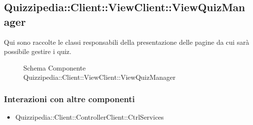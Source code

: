 \subsection{Quizzipedia::Client::ViewClient::ViewQuizManager}
Qui sono raccolte le classi responsabili della presentazione delle pagine da cui sarà possibile gestire i quiz.
\begin{figure}[H]
\centering
\noindent{}
\caption[Schema Componente Quizzipedia::Client::ViewClient::ViewQuizManager]{Schema Componente Quizzipedia::Client::ViewClient::ViewQuizManager}
\end{figure}
\subsubsection{Interazioni con altre componenti}
\begin{itemize}
\item Quizzipedia::Client::ControllerClient::CtrlServices
\end{itemize}
